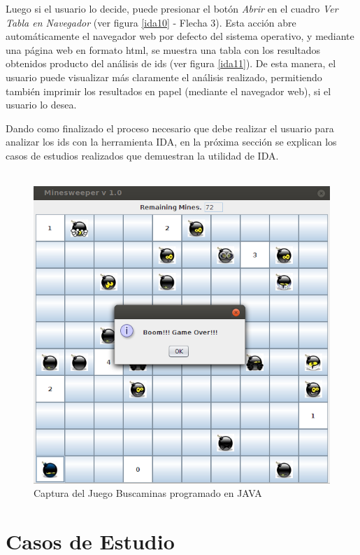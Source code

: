 Luego si el usuario lo decide, puede presionar el botón \textit{Abrir} en el cuadro \textit{Ver Tabla en Navegador} (ver figura \ref{ida10} - Flecha 3). Esta acción abre automáticamente el navegador web por defecto del sistema operativo, y mediante una página web en formato html, se muestra una tabla con los resultados obtenidos producto del análisis de ids (ver figura \ref{ida11}). De esta manera, el usuario puede visualizar más claramente el análisis realizado, permitiendo también imprimir los resultados en papel (mediante el navegador web), si el usuario lo desea.

Dando como finalizado el proceso necesario que debe realizar el usuario para analizar los ids con la herramienta IDA, en la próxima sección se explican los casos de estudios realizados que demuestran la utilidad de IDA.\\\\

\begin{figure}[h!] %
\centerline{%
\includegraphics[scale= 0.6]{./cap4/caso_01.png}
}
\caption{Captura del Juego Buscaminas programado en JAVA}
\label{caso1}
\end{figure}

\pagebreak

\section{Casos de Estudio}

